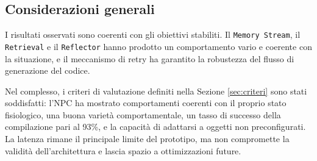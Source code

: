 \subsection{Considerazioni generali}

I risultati osservati sono coerenti con gli obiettivi stabiliti. Il \texttt{Memory Stream}, il \texttt{Retrieval} e il \texttt{Reflector} hanno prodotto un comportamento vario e coerente con la situazione, e il meccanismo di retry ha garantito la robustezza del flusso di generazione del codice.

Nel complesso, i criteri di valutazione definiti nella Sezione \ref{sec:criteri} sono stati soddisfatti: l'NPC ha mostrato comportamenti coerenti con il proprio stato fisiologico, una buona varietà comportamentale, un tasso di successo della compilazione pari al 93\%, e la capacità di adattarsi a oggetti non preconfigurati. La latenza rimane il principale limite del prototipo, ma non compromette la validità dell'architettura e lascia spazio a ottimizzazioni future.

